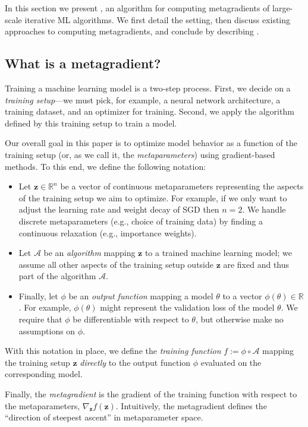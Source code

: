 In this section we present \replay{}, an algorithm for computing metagradients
of large-scale iterative ML algorithms. We first detail the setting, 
then discuss existing approaches to computing metagradients, 
and conclude by describing \replay{}.

\subsection{What is a metagradient?}
\label{subsec:meta_gradient}
Training a machine learning model is a two-step process. 
First, we decide on a {\em training setup}---we must pick,
for example, a neural network architecture, 
a training dataset, and an optimizer for training.
Second, we apply the algorithm defined by this training setup to 
train a model.

Our overall goal in this paper is to optimize model behavior as a 
function of the training setup 
(or, as we call it, the {\em metaparameters}) using
gradient-based methods. To this end, we define the following notation:
\begin{itemize}
	\item Let $\mathbf{z} \in \mathbb{R}^n$ be a vector of continuous 
    metaparameters representing the aspects of the training setup we aim to optimize. 
    For example, if we only want to adjust the learning rate and weight decay of
    SGD then $n = 2$. We handle discrete metaparameters (e.g., choice of training data)
    by finding a continuous relaxation (e.g., importance weights).
	\item Let $\mathcal{A}$ be an {\em algorithm} mapping $\mathbf{z}$ to a trained
    machine learning model; we assume all other
	aspects of the training setup outside $\mathbf{z}$ are fixed and thus part of the
    algorithm $\mathcal{A}$.  
    \item Finally, let $\phi$ be an {\em output function} mapping a model
    $\theta$ to a vector $\phi(\theta) \in \mathbb{R}$.
    For example, $\phi(\theta)$ might represent the validation loss of the model $\theta$.
    We require that $\phi$ be differentiable with respect to $\theta$, but otherwise 
    make no assumptions on $\phi$.
\end{itemize}
With this notation in place, we define the 
{\em training function} $f := \phi \circ \mathcal{A}$
mapping the training setup $\mathbf{z}$ 
{\em directly} to the output function $\phi$ evaluated on the corresponding model. 

Finally, the {\em metagradient} is the gradient of the training function with 
respect to the metaparameters, $\nabla_\mathbf{z} f(\mathbf{z})$. 
Intuitively, the metagradient defines the ``direction of steepest ascent'' in
metaparameter space.


